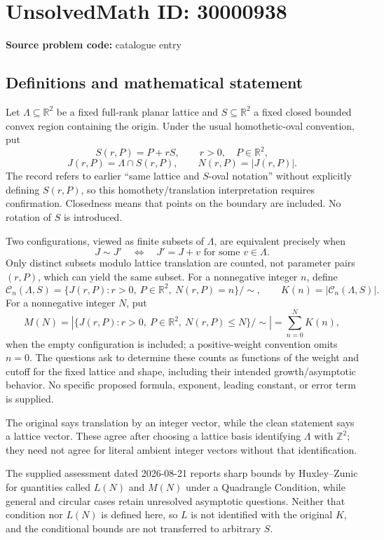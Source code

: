 \documentclass[11pt]{article}
\newcommand{\Z}{\mathbb{Z}}
\newcommand{\R}{\mathbb{R}}
\begin{document}
\section*{UnsolvedMath ID: 30000938}
\textbf{Source problem code:} catalogue entry
\subsection{Definitions and mathematical statement}
Let \(\Lambda\subseteq\R^2\) be a fixed full-rank planar lattice and \(S\subseteq\R^2\) a fixed closed bounded convex region containing the origin. Under the usual homothetic-oval convention, put
\[
 S(r,P)=P+rS,\qquad r>0,\quad P\in\R^2,
\]
\[
 J(r,P)=\Lambda\cap S(r,P),\qquad
 N(r,P)=|J(r,P)|.
\]
The record refers to earlier ``same lattice and \(S\)-oval notation'' without explicitly defining \(S(r,P)\), so this homothety/translation interpretation requires confirmation. Closedness means that points on the boundary are included. No rotation of \(S\) is introduced.

Two configurations, viewed as finite subsets of \(\Lambda\), are equivalent precisely when
\[
 J\sim J'\quad\Longleftrightarrow\quad
 J'=J+v\text{ for some }v\in\Lambda.
\]
Only distinct subsets modulo lattice translation are counted, not parameter pairs \((r,P)\), which can yield the same subset. For a nonnegative integer \(n\), define
\[
 \mathcal C_n(\Lambda,S)=
 \{J(r,P):r>0,\ P\in\R^2,\ N(r,P)=n\}/\!\sim,
 \qquad K(n)=|\mathcal C_n(\Lambda,S)|.
\]
For a nonnegative integer \(N\), put
\[
 M(N)=\left|\{J(r,P):r>0,\ P\in\R^2,\ N(r,P)\leq N\}/\!\sim\right|
      =\sum_{n=0}^N K(n),
\]
when the empty configuration is included; a positive-weight convention omits \(n=0\). The questions ask to determine these counts as functions of the weight and cutoff for the fixed lattice and shape, including their intended growth/asymptotic behavior. No specific proposed formula, exponent, leading constant, or error term is supplied.

The original says translation by an integer vector, while the clean statement says a lattice vector. These agree after choosing a lattice basis identifying \(\Lambda\) with \(\Z^2\); they need not agree for literal ambient integer vectors without that identification.

The supplied assessment dated 2026-08-21 reports sharp bounds by Huxley--Zunic for quantities called \(L(N)\) and \(M(N)\) under a Quadrangle Condition, while general and circular cases retain unresolved asymptotic questions. Neither that condition nor \(L(N)\) is defined here, so \(L\) is not identified with the original \(K\), and the conditional bounds are not transferred to arbitrary \(S\).
\end{document}
